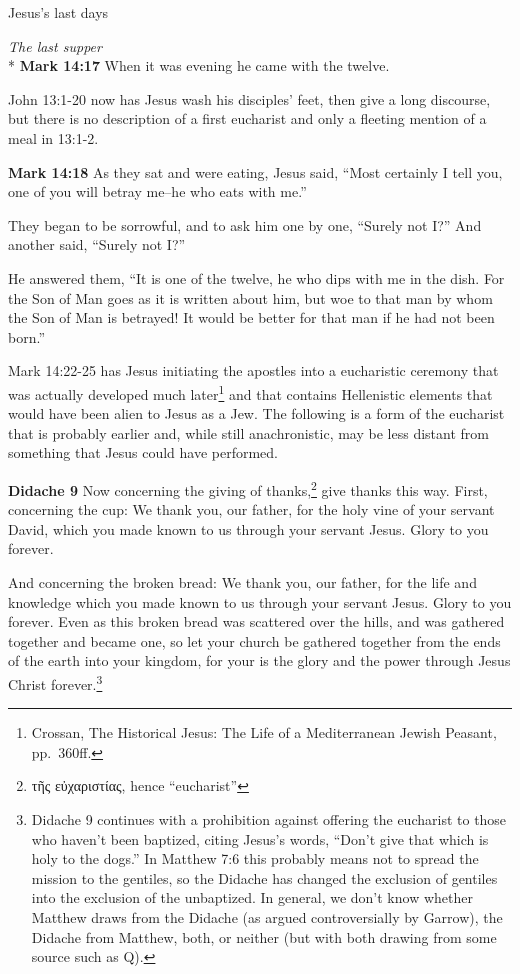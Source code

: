 \documentclass[10pt,twoside]{article} %
\newcommand{\doimage}[2]{\texttt{[image: \#2]}\label{fig:#2}}
\newcommand{\figbasic}[4]{ %
    \ifthenelse{\isodd{\pageref{fig:#2}}}{}{\hfill}
    \ifstrempty{#3}{
      \doimage{#1}{#2}
    }{
      \makebox{\doimage{#1}{#2} \\ #3}
    }
    \ifthenelse{\isodd{\pageref{fig:#2}}}{\hfill}{}
    \par
}
\newcommand{\fig}[2][0.4]{
  \figbasic{#1}{#2}{}{}
}
\newcommand{\quotesize}{\normalsize{}}
\newcommand{\comm}[1]{\begingroup \color{black!50} #1\endgroup}
\newenvironment{quotetext}{\begingroup\quotesize}{\endgroup}
\newcommand{\intex}[1]{\index[texts]{#1}}
\newcommand{\bible}[2]{\begin{quotetext}\textbf{#1}\intex{#1} #2\end{quotetext}}
\newcommand{\gospelmark}[2]{\bible{Mark #1}{#2}}
\newcommand{\subhead}[1]{\emph{#1}\\*}
\begin{document}
\begin{section}{Jesus's last days}
\fig[1]{last-supper}

\subhead{The last supper}
\gospelmark{14:17}{
When it was evening he came with the twelve.}

\comm{John 13:1-20 now has Jesus wash his disciples' feet, then give a long discourse, but there is no description of
a first eucharist and only a fleeting mention of a meal in 13:1-2.}

\gospelmark{14:18}{
     As they sat and were eating, Jesus said, ``Most certainly I tell you, one of you will betray me--he who eats with me.''

  They began to be sorrowful, and to ask him one by one, ``Surely not I?'' And another said, ``Surely not I?''

  He answered them, ``It is one of the twelve, he who dips with me in the dish.    For the Son of Man goes as it is written about him, but woe to that man by whom the Son of Man is betrayed! It would be better for that man if he had not been born.''
}

\comm{Mark 14:22-25 has Jesus initiating the apostles into a eucharistic ceremony that was actually developed much 
later\footnote{Crossan, The Historical Jesus: The Life of a Mediterranean Jewish Peasant, pp.~360ff.}
and that contains Hellenistic elements that would have been alien to Jesus as a Jew. The following is a form of the eucharist that
is probably earlier and, while still anachronistic, may be less distant from something that Jesus could have performed.}


\bible{Didache 9}{
Now concerning the giving of thanks,\footnote{τῆς εὐχαριστίας, hence  ``eucharist''} give thanks this way. First, concerning the cup:
We thank you, our father, for the holy vine of your servant David, which you made known to us through your servant Jesus.
Glory to you forever.

And concerning the broken bread:
We thank you, our father, for the life and knowledge which you made known to us through your servant Jesus.
Glory to you forever.
Even as this broken bread was scattered over the hills, and was gathered together and became one, so let
your church be gathered together from the ends of the earth into your kingdom, for your is the glory and the power through Jesus Christ 
forever.\footnote{Didache 9 continues with a prohibition against offering the eucharist to those who haven't been baptized,
citing Jesus's words, ``Don't give that which is holy to the dogs.'' In Matthew 7:6 this probably means not to spread the
mission to the gentiles, so the Didache has changed the exclusion of gentiles into the exclusion of the unbaptized.
In general, we don't know whether Matthew draws from
the Didache (as argued controversially by Garrow), the Didache from Matthew, both, or neither (but with both drawing from some
source such as Q).}
}


\end{section}
\end{document}
